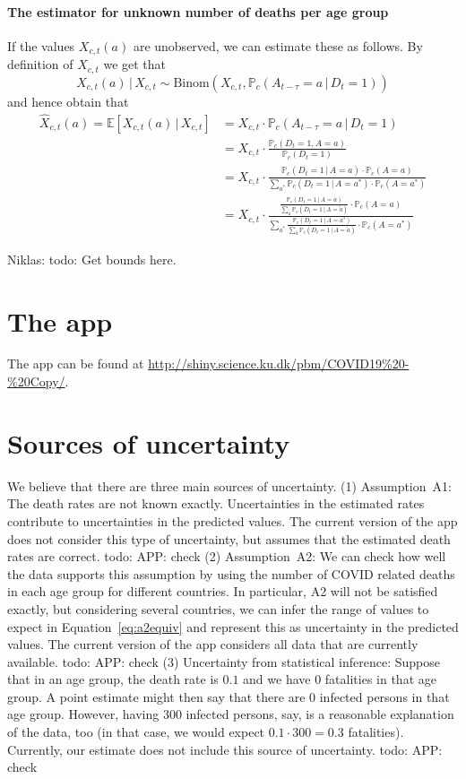 \documentclass[a4paper]{article}
\newcommand\todo[1]{{\color{red}todo: #1}}
\renewcommand\P{\mathbb{P}}
\newcommand\E{\mathbb{E}}
\newcommand{\given}{\, \vert \,}
\newcommand\Niklas[1]{{\color{Fuchsia}Niklas: #1}}
\begin{document}
\paragraph{The estimator for unknown number of deaths per age group}
%
If the values $X_{c,t}(a)$ are unobserved, we can estimate these as follows. By definition of $X_{c,t}$ we get that
$$X_{c,t}(a) \given X_{c,t} \sim \text{Binom}(X_{c,t}, \P_c(A_{t-\tau} = a \given D_{t} = 1))$$
and hence obtain that
\begin{align*}
\hat{X}_{c,t}(a) = \E[X_{c,t}(a) \given X_{c,t}] 	
&= X_{c,t} \cdot \P_c(A_{t-\tau} = a \given D_{t} = 1) \\
     &= 
X_{c,t} \cdot 
\frac{  
    \P_c(D_t = 1, A = a)}
  {\P_c(D_t = 1)}\\
    &= 
X_{c,t} \cdot 
\frac{  
    \P_c(D_t = 1\given A = a)
     \cdot \P_c(A = a)}
  {\sum_{a^*}  
    \P_c(D_t = 1\given A = a^*) \cdot \P_c(A = a^*)
    }\\
&= 
X_{c,t} \cdot 
\frac{
  \frac{
    \P_c(D_t = 1\given A = a)}
    {\sum_{\tilde{a}} \P_c(D_t = 1 \given A = \tilde{a})} \cdot \P_c(A = a)}
  {\sum_{a^*}  
  \frac{
    \P_c(D_t = 1\given A = a^*)}
    {\sum_{\tilde{a}} \P_c(D_t = 1 \given A = \tilde{a})} \cdot \P_c(A = a^*)}
\end{align*}

\Niklas{todo: Get bounds here.}


\section{The app}
The app 
can be found at 
\url{http://shiny.science.ku.dk/pbm/COVID19%20-%20Copy/}.


\section{Sources of uncertainty} \label{sec:uncert}
We believe that there are 
three main sources of uncertainty. 
(1) Assumption~A1: 
The death rates are not known exactly. Uncertainties in the 
estimated rates
contribute to uncertainties in the
predicted values.
The current version of the app does not consider
this type of uncertainty, but assumes 
that the estimated death rates are correct.
\todo{APP: check} 
(2) Assumption~A2: We can check 
how well the data supports 
this assumption by using 
the number of COVID related deaths in each age group for different countries. 
In particular, A2 will not be satisfied exactly, but 
considering several countries, we can 
infer the range of values to expect in Equation~\eqref{eq:a2equiv}
and represent this as uncertainty in the predicted values. 
The current version of the app considers
all data that are currently available.
\todo{APP: check}
(3) Uncertainty from statistical inference: 
Suppose that in an age group, the death rate is $0.1$ and we have 
$0$ fatalities in that age group.
A point estimate might then say that there are $0$ infected persons
in that age group. However, having $300$ infected persons, say,
is a reasonable explanation of the data, too (in that case, we would expect $0.1\cdot 300 = 0.3$ fatalities).
Currently, our estimate does not include this source of uncertainty. 
\todo{APP: check}
\end{document}
